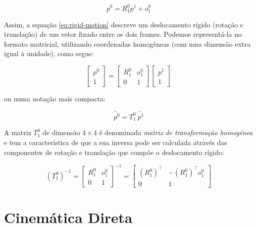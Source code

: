 \begin{equation}\label{eq:rigid-motion}
    p^0 = R_1^0 p^1 + o_1^0
\end{equation}

Assim, a equação \ref{eq:rigid-motion} descreve um deslocamento rígido 
(rotação e translação) de um vetor fixado entre os dois frames.
Podemos representá-la no formato matricial, utilizando coordenadas
homogêneas (com uma dimensão extra igual à unidade), como segue:

\begin{equation}
    \begin{bmatrix}
        p^0 \\
        1
    \end{bmatrix} = \begin{bmatrix}
        R_1^0 & o_1^0 \\
        0     & 1
    \end{bmatrix} \begin{bmatrix}
        p^1 \\
        1
    \end{bmatrix}
\end{equation}

ou numa notação mais compacta:

\begin{equation}
    \tilde{p^0} = T_1^0 \ \tilde{p^1}
\end{equation}

A matriz \(T_1^0\) de dimensão \(4 \times 4\) é denominada
\emph{matriz de transformação homogênea} e tem a característica
de que a sua inversa pode ser calculada através das componentes
de rotação e translação que compõe o deslocamento rígido:

\begin{equation}
    {(T_1^0)}^{-1} = \begin{bmatrix}
        R_1^0 & o_1^0 \\
        0     & 1
    \end{bmatrix}^{-1} = \begin{bmatrix}
        {(R_1^0)}^{\top} & -{(R_1^0)}^{\top} o_1^0 \\
        0                & 1
    \end{bmatrix}
\end{equation}

\section{Cinemática Direta}

